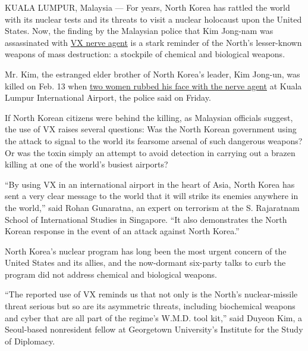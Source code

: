 KUALA LUMPUR, Malaysia --- For years, North Korea has rattled the world
with its nuclear tests and its threats to visit a nuclear holocaust upon
the United States. Now, the finding by the Malaysian police that Kim
Jong-nam was assassinated with
\href{https://www.nytimes3xbfgragh.onion/2017/02/24/world/asia/vx-nerve-agent-kim-jong-nam.html?rref=collection\%2Fsectioncollection\%2Fasia\&action=click\&contentCollection=asia\&region=stream\&module=stream_unit\&version=latest\&contentPlacement=5\&pgtype=sectionfront}{VX
nerve agent} is a stark reminder of the North's lesser-known weapons of
mass destruction: a stockpile of chemical and biological weapons.

Mr. Kim, the estranged elder brother of North Korea's leader, Kim
Jong-un, was killed on Feb. 13 when
\href{https://www.nytimes3xbfgragh.onion/2017/02/22/world/asia/kim-jong-nam-assassination-korea-malaysia.html?rref=collection\%2Fsectioncollection\%2Fasia\&action=click\&contentCollection=asia\&region=stream\&module=stream_unit\&version=latest\&contentPlacement=6\&pgtype=sectionfront}{two
women rubbed his face with the nerve agent} at Kuala Lumpur
International Airport, the police said on Friday.

If North Korean citizens were behind the killing, as Malaysian officials
suggest, the use of VX raises several questions: Was the North Korean
government using the attack to signal to the world its fearsome arsenal
of such dangerous weapons? Or was the toxin simply an attempt to avoid
detection in carrying out a brazen killing at one of the world's busiest
airports?

``By using VX in an international airport in the heart of Asia, North
Korea has sent a very clear message to the world that it will strike its
enemies anywhere in the world,'' said Rohan Gunaratna, an expert on
terrorism at the S. Rajaratnam School of International Studies in
Singapore. ``It also demonstrates the North Korean response in the event
of an attack against North Korea.''

North Korea's nuclear program has long been the most urgent concern of
the United States and its allies, and the now-dormant six-party talks to
curb the program did not address chemical and biological weapons.

``The reported use of VX reminds us that not only is the North's
nuclear-missile threat serious but so are its asymmetric threats,
including biochemical weapons and cyber that are all part of the
regime's W.M.D. tool kit,'' said Duyeon Kim, a Seoul-based nonresident
fellow at Georgetown University's Institute for the Study of Diplomacy.

